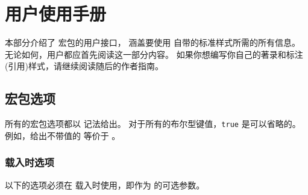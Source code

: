 
\section{用户使用手册}
\label{use}


本部分介绍了 \biblatex 宏包的用户接口，
涵盖要使用 \biblatex 自带的标准样式所需的所有信息。
无论如何，用户都应首先阅读这一部分内容。
如果你想编写你自己的著录和标注(引用)样式，请继续阅读随后的作者指南。

\subsection{宏包选项}
\label{use:opt}


所有的宏包选项都以 \keyval 记法给出。
对于所有的布尔型键值，\texttt{true} 是可以省略的。
例如，给出不带值的  等价于 。

\subsubsection{载入时选项}
\label{use:opt:ldt}


以下的选项必须在 \biblatex 载入时使用，即作为  的可选参数。

